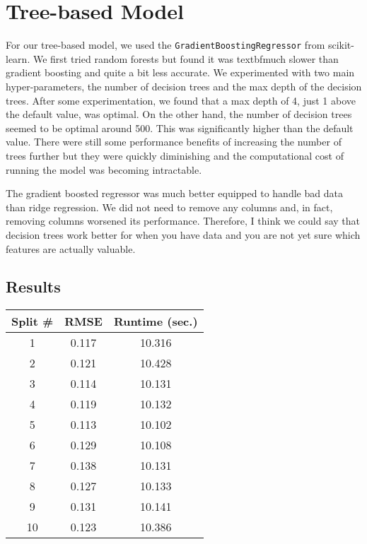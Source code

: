 \documentclass{article}
\begin{document}
\section{Tree-based Model}

For our tree-based model, we used the \verb.GradientBoostingRegressor. from scikit-learn. We first tried random forests but found it was textbf{much} slower than gradient boosting and quite a bit less accurate. We experimented with two main hyper-parameters, the number of decision trees and the max depth of the decision trees. After some experimentation, we found that a max depth of 4, just 1 above the default value, was optimal. On the other hand, the number of decision trees seemed to be optimal around 500. This was significantly higher than the default value. There were still some performance benefits of increasing the number of trees further but they were quickly diminishing and the computational cost of running the model was becoming intractable.

The gradient boosted regressor was much better equipped to handle bad data than ridge 
regression. We did not need to remove any columns and, in fact, removing columns worsened
its performance. Therefore, I think we could say that decision trees work better for 
when you have data and you are not yet sure which features are actually valuable. 



\subsection{Results}


\begin{center} 
    \begin{tabular}{ | c |  c |  c |} 
        \hline
        Split \# & RMSE & Runtime (sec.) \\ 
        \hline\hline
        1 & 0.117 & 10.316 \\ 
        \hline 
        2 & 0.121 & 10.428 \\ 
        \hline 
        3 & 0.114 & 10.131 \\ 
        \hline 
        4 & 0.119 & 10.132\\ 
        \hline 
        5 & 0.113 & 10.102 \\ 
        \hline 
        6 & 0.129 & 10.108 \\ 
        \hline
         7 & 0.138 & 10.131 \\ 
         \hline 
        8 & 0.127 & 10.133 \\ 
        \hline 
        9 & 0.131 & 10.141 \\ 
        \hline
        10 & 0.123 & 10.386 \\ 
        \hline 
    \end{tabular} 
\end{center}
\end{document}
